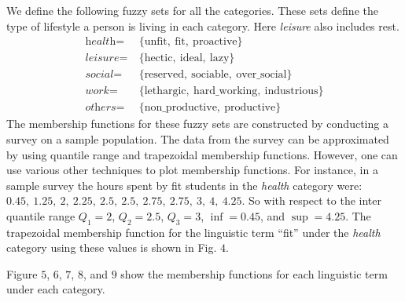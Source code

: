 \documentclass[conference]{IEEEtran}
\newcommand{\quotes}[1]{``#1''}
\begin{document}
We define the following fuzzy sets for all the categories. These sets define the type of lifestyle a person is living in each category. Here \textit{leisure} also includes rest.
\begin{align*}
\textit{health}=&\ \{\text{unfit},\ \text{fit},\ \text{proactive}\}\\
\textit{leisure}=&\ \{\text{hectic},\ \text{ideal},\ \text{lazy}\}\\
\textit{social}=&\ \{\text{reserved},\ \text{sociable},\ \text{over\_social}\}\\
\textit{work}=&\ \{\text{lethargic},\ \text{hard\_working},\ \text{industrious}\}\\
\textit{others}=&\ \{\text{non\_productive},\ \text{productive}\}
\end{align*}
The membership functions for these fuzzy sets are constructed by conducting a survey on a sample population. The data from the survey can be approximated by using quantile range and trapezoidal membership functions. However, one can use various other techniques to plot membership functions. For instance, in a sample survey the hours spent by fit students in the \textit{health} category were: $0.45,\ 1.25,\ 2,\ 2.25,\ 2.5,\ 2.5,\ 2.75,\ 2.75,\ 3,\ 4,\ 4.25$. So with respect to the inter quantile range $Q_1 = 2$, $Q_2 = 2.5$, $Q_3 = 3$, $\inf = 0.45$, and $\sup = 4.25$. The trapezoidal membership function for the linguistic term \quotes{fit} under the \textit{health} category using these values is shown in Fig. $4$.

Figure $5$, $6$, $7$, $8$, and $9$ show the membership functions for each linguistic term under each category.
\end{document}
